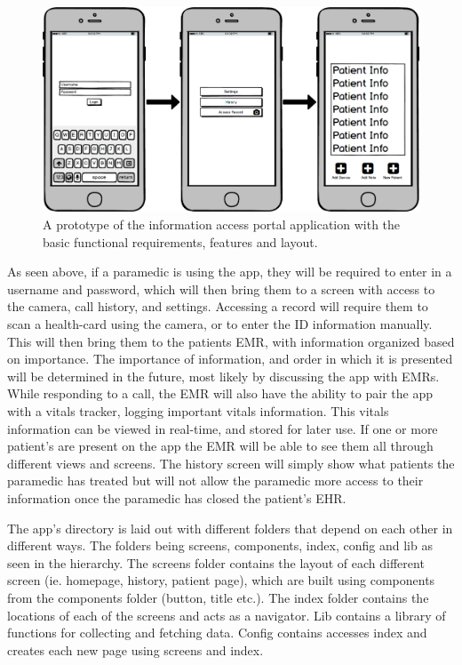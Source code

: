 \begin{figure}[h]
  \centering
  \includegraphics[width=\linewidth]{wireframe.png}
  \captionsetup{format=hang}
  \caption[Preliminary App Prototype]{A prototype of the information access portal application with the basic functional requirements, features and layout.}
  \label{fig:app1}
\end{figure}

As seen above, if a paramedic is using the app, they will be required to enter in a username and password, which will then bring them to a screen with access to the camera, call history, and settings. Accessing a record will require them to scan a health-card using the camera, or to enter the ID information manually. This will then bring them to the patients EMR, with information organized based on importance. The importance of information, and order in which it is presented will be determined in the future, most likely by discussing the app with EMRs. While responding to a call, the EMR will also have the ability to pair the app with a vitals tracker, logging important vitals information. This vitals information can be viewed in real-time, and stored for later use. If one or more patient's are present on the app the EMR will be able to see them all through different views and screens. The history screen will simply show what patients the paramedic has treated but will not allow the paramedic more access to their information once the paramedic has closed the patient's EHR.

\iffalse


The app's directory is laid out with different folders that depend on each other in different ways. The folders being screens, components, index, config and lib as seen in the hierarchy. The screens folder contains the layout of each different screen (ie. homepage, history, patient page), which are built using components from the components folder (button, title etc.). The index folder contains the locations of each of the screens and acts as a navigator. Lib contains a library of functions for collecting and fetching data. Config contains accesses index and creates each new page using screens and index.




